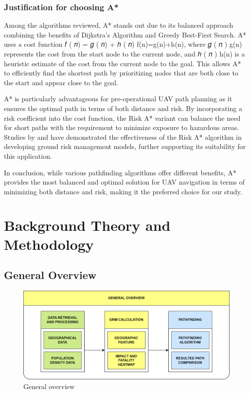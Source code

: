 \documentclass[12pt]{report}
\begin{document}
        \subsection{Justification for choosing A*}
        Among the algorithms reviewed, A* stands out due to its balanced approach combining the benefits of Dijkstra’s
        Algorithm and Greedy Best-First Search. A* uses a cost function 𝑓 ( 𝑛) = 𝑔 ( 𝑛) + ℎ ( 𝑛) f(n)=g(n)+h(n), where 𝑔 (
        𝑛 ) g(n) represents the cost from the start node to the current node, and ℎ ( 𝑛 ) h(n) is a heuristic estimate of the
        cost from the current node to the goal. This allows A* to efficiently find the shortest path by prioritizing nodes that
        are both close to the start and appear close to the goal.
            
        A* is particularly advantageous for pre-operational UAV path planning as it ensures the optimal path in terms of both
        distance and risk. By incorporating a risk coefficient into the cost function, the Risk A* variant can balance the need
        for short paths with the requirement to minimize exposure to hazardous areas. Studies by \cite{primatesta_ground_2020}
        and \cite{clothier_casualty_2007} have demonstrated the effectiveness of the Risk A* algorithm in developing ground risk
        management models, further supporting its suitability for this application.
            
        In conclusion, while various pathfinding algorithms offer different benefits, A* provides the most balanced and optimal
        solution for UAV navigation in terms of minimizing both distance and risk, making it the preferred choice for our study.


\chapter{Background Theory and Methodology}
    \section{General Overview}
        \begin{figure}[H]
            \centering
            \includegraphics[width=\textwidth]{General Image/OSM Drone-General Overview.png}
            \caption{General overview}
        \end{figure}
\end{document}
